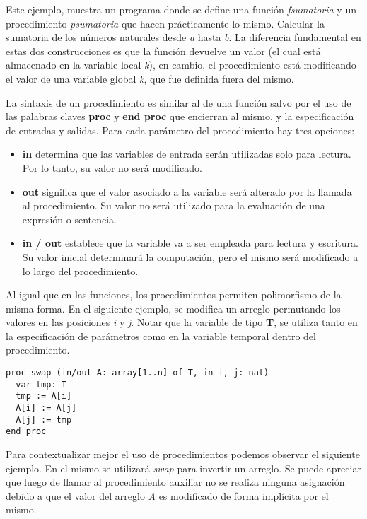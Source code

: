 \documentclass{article}
\begin{document}
Este ejemplo, muestra un programa donde se define una función \textit{f\gbajo sumatoria} y un procedimiento \textit{p\gbajo sumatoria} que hacen prácticamente lo mismo.
Calcular la sumatoria de los números naturales desde \textit{a} hasta \textit{b}.
La diferencia fundamental en estas dos construcciones es que la función devuelve un valor (el cual está almacenado en la variable local \textit{k}), en cambio, el procedimiento está modificando el valor de una variable global \textit{k}, que fue definida fuera del mismo.

La sintaxis de un procedimiento es similar al de una función salvo por el uso de las palabras claves \textbf{proc} y \textbf{end proc} que encierran al mismo, y la especificación de entradas y salidas.
Para cada parámetro del procedimiento hay tres opciones:

\begin{itemize}
\item \textbf{in} determina que las variables de entrada serán utilizadas solo para lectura.
Por lo tanto, su valor no será modificado.
\item \textbf{out} significa que el valor asociado a la variable será alterado por la llamada al procedimiento.
Su valor no será utilizado para la evaluación de una expresión o sentencia.
\item \textbf{in / out} establece que la variable va a ser empleada para lectura y escritura.
Su valor inicial determinará la computación, pero el mismo será modificado a lo largo del procedimiento.
\end{itemize}

Al igual que en las funciones, los procedimientos permiten polimorfismo de la misma forma.
En el siguiente ejemplo, se modifica un arreglo permutando los valores en las posiciones \textit{i} y \textit{j}.
Notar que la variable de tipo \textbf{T}, se utiliza tanto en la especificación de parámetros como en la variable temporal dentro del procedimiento.

\begin{lstlisting}
proc swap (in/out A: array[1..n] of T, in i, j: nat)
  var tmp: T
  tmp := A[i]
  A[i] := A[j]
  A[j] := tmp
end proc
\end{lstlisting}

Para contextualizar mejor el uso de procedimientos podemos observar el siguiente ejemplo.
En el mismo se utilizará \textit{swap} para invertir un arreglo.
Se puede apreciar que luego de llamar al procedimiento auxiliar no se realiza ninguna asignación debido a que el valor del arreglo \textit{A} es modificado de forma implícita por el mismo.
\end{document}
